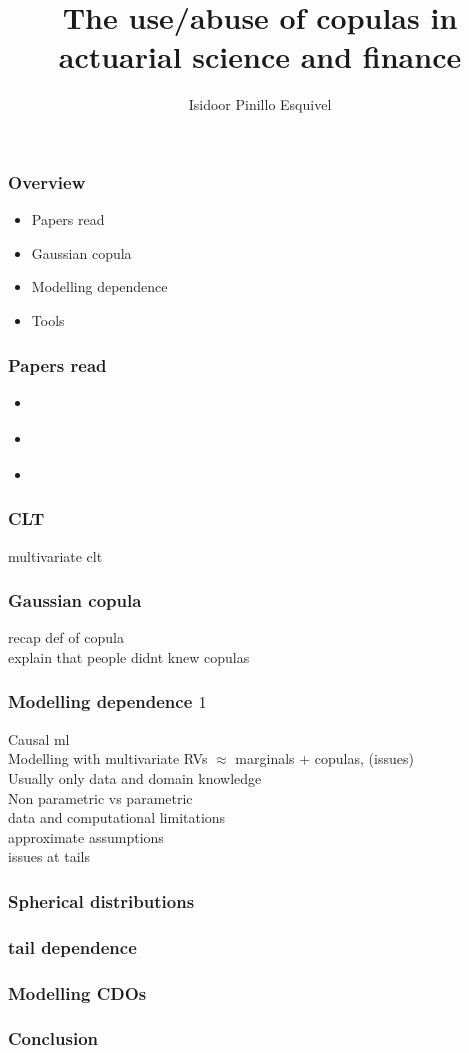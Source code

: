 \documentclass[18pt,aspectratio=149]{beamer}
\title{The use/abuse of copulas in actuarial science and finance}
\author{Isidoor Pinillo Esquivel}
\date{}
\begin{document}
\begin{frame}
    \titlepage
\end{frame}
\begin{frame}
    \frametitle{Overview}
    \begin{itemize}
        \item Papers read
        \item Gaussian copula
        \item Modelling dependence
        \item Tools
    \end{itemize}
\end{frame}

\begin{frame}
    \frametitle{Papers read}
    \begin{itemize}
        \item \textcite{dempster_correlation_2002}
        \item \textcite{frees_understanding_1998}
        \item \textcite{donnelly_devil_nodate}
    \end{itemize}

\end{frame}

\begin{frame}
    \frametitle{CLT}
    multivariate clt
\end{frame}

\begin{frame}
    \frametitle{Gaussian copula}
    recap def of copula \\
    explain that people didnt knew copulas
\end{frame}

\begin{frame}
    \frametitle{Modelling dependence $1$}
    Causal ml \\
    Modelling with multivariate RVs $\approx$ marginals + copulas, (issues) \\
    Usually only data and domain knowledge \\
    Non parametric vs parametric \\
    data  and computational limitations \\
    approximate assumptions \\
    issues at tails \\
\end{frame}

\begin{frame}
    \frametitle{Spherical distributions}
\end{frame}

\begin{frame}
    \frametitle{tail dependence}
\end{frame}

\begin{frame}
    \frametitle{Modelling CDOs}
\end{frame}

\begin{frame}
    \frametitle{Conclusion}
\end{frame}
\end{document}
